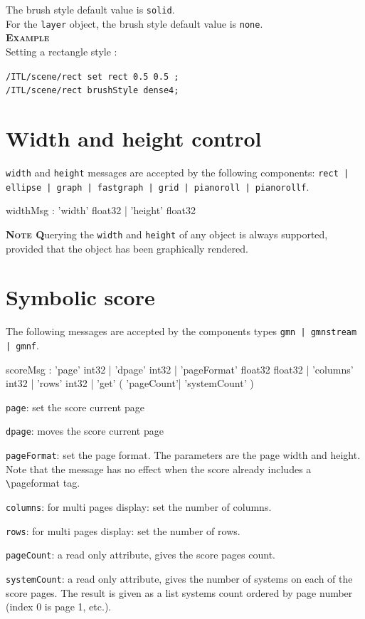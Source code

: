 \documentclass[a4paper,twoside]{report}
\newcommand{\sublevel}[1]	{\section{#1}}
\newcommand{\OSC}[1]		{\texttt{#1}}
\newcommand{\example}		{\textbf{\hspace{-1.5cm}\textbf{\textsc{Example }}}}
\newcommand{\note}	[1]		{\vspace{2mm}\textbf{\hspace{-0.9cm}\textbf{\textsc{Note #1}}}}
\let\olditemize\itemize
\let\oldenditemize\enditemize
\renewenvironment{itemize} 	{\olditemize \setlength{\itemsep}{1mm}}{\oldenditemize}
\newcommand{\sample}	[1]			{\vspace{-2mm}\begin{center}\colorbox{mygrey}{
								\begin{minipage}[t]{0.9\columnwidth} 
								{\small \texttt{#1}}
								\end{minipage}}\end{center}}
\begin{document}
The brush style default value is \OSC{solid}.\\
For the \OSC{layer} object, the brush style default value is \OSC{none}.\\

\example \\
Setting a rectangle style :
\sample{/ITL/scene/rect set rect 0.5 0.5 ;\\
/ITL/scene/rect brushStyle dense4; 
}


\sublevel{Width and height control}

\OSC{width} and \OSC{height} messages are accepted by the following components: \OSC{rect | ellipse | graph | fastgraph | grid | pianoroll | pianorollf}.

\begin{rail}
widthMsg :  'width' float32
			| 'height' float32
\end{rail}

\note 
Querying the \OSC{width} and \OSC{height} of any object is always supported, provided that the object has been graphically rendered.


\sublevel{Symbolic score}
\label{gmnpage}

The following messages are accepted by the components types \OSC{gmn | gmnstream | gmnf}. 
\begin{rail}
scoreMsg :      'page' int32
			| 'dpage' int32
			| 'pageFormat' float32 float32
			| 'columns' int32
			| 'rows' int32
			| 'get' ( 'pageCount'| 'systemCount' )
\end{rail}


\begin{itemize}
\item \OSC{page}: set the score current page
\item \OSC{dpage}: moves the score current page
\item \OSC{pageFormat}: set the page format. The parameters are the page width and height. Note that the message has no effect when the score already includes a \verb+\+pageformat tag.
\item \OSC{columns}: for multi pages display: set the number of columns.
\item \OSC{rows}: for multi pages display: set the number of rows.
\item \OSC{pageCount}:  a read only attribute, gives the score pages count.
\item \OSC{systemCount}:  a read only attribute, gives the number of systems on each of the score pages. The result is given as a list systems count ordered by page number (index 0 is page 1, etc.).
\end{itemize}
\end{document}

